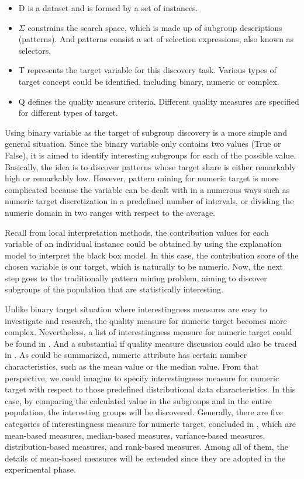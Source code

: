 \begin{itemize}
	\item D is a dataset and is formed by a set of instances. 
	\item $\Sigma$ constrains the search space, which is made up of subgroup descriptions (patterns). And patterns consist a set of selection expressions, also known as selectors.
	\item T represents the target variable for this discovery task. Various types of target concept could be identified, including binary, numeric or complex. 
	\item Q defines the quality measure criteria. Different quality measures are specified for different types of target. 
\end{itemize}

Using binary variable as the target of subgroup discovery is a more simple and general situation. Since the binary variable only contains two values (True or False), it is aimed to identify interesting subgroups for each of the possible value. Basically, the idea is to discover patterns whose target share is either remarkably high or remarkably low. However, pattern mining for numeric target is more complicated because the variable can be dealt with in a numerous ways such as numeric target discretization in a predefined number of intervals, or dividing the numeric domain in two ranges with respect to the average. 

Recall from local interpretation methods, the contribution values for each variable of an individual instance could be obtained by using the explanation model to interpret the black box model. In this case, the contribution score of the chosen variable is our target, which is naturally to be numeric. Now, the next step goes to the traditionally pattern mining problem, aiming to discover subgroups of the population that are statistically interesting. 

Unlike binary target situation where interestingness measures are easy to investigate and research, the quality measure for numeric target becomes more complex. Nevertheless, a list of interestingness measure for numeric target could be found in \cite{klosgen2002data}. And a substantial if quality measure discussion could also be traced in \cite{pieters2010subgroup}. As could be summarized, numeric attribute has certain number characteristics, such as the mean value or the median value. From that perspective, we could imagine to specify interestingness measure for numeric target with respect to those predefined distributional data characteristics. In this case, by comparing the calculated value in the subgroups and in the entire population, the interesting groups will be discovered. Generally, there are five categories of interestingness measure for numeric target, concluded in \cite{lemmerich2014novel}, which are mean-based measures, median-based measures, variance-based measures, distribution-based measures, and rank-based measures. Among all of them, the details of mean-based measures will be extended since they are adopted in the experimental phase. 

